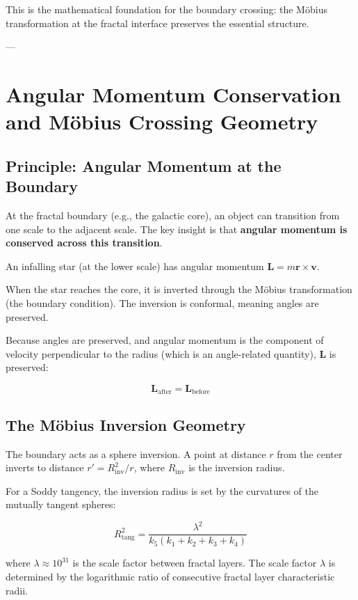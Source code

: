 \documentclass[11pt,a4paper]{article}
\begin{document}
    This is the mathematical foundation for the boundary crossing: the Möbius transformation at the fractal interface preserves the essential structure.

---


\section{Angular Momentum Conservation and Möbius Crossing Geometry}

  \subsection{Principle: Angular Momentum at the Boundary}

    At the fractal boundary (e.g., the galactic core), an object can transition from one scale to the adjacent scale. The key insight is that \textbf{angular momentum is conserved across this transition}.

    An infalling star (at the lower scale) has angular momentum $\mathbf{L} = m\mathbf{r} \times \mathbf{v}$.

    When the star reaches the core, it is inverted through the Möbius transformation (the boundary condition). The inversion is conformal, meaning angles are preserved.

    Because angles are preserved, and angular momentum is the component of velocity perpendicular to the radius (which is an angle-related quantity), $\mathbf{L}$ is preserved:

    \[
    \mathbf{L}_{\text{after}} = \mathbf{L}_{\text{before}}
    \]

  \subsection{The Möbius Inversion Geometry}

    The boundary acts as a sphere inversion. A point at distance $r$ from the center inverts to distance $r' = R_{\text{inv}}^2 / r$, where $R_{\text{inv}}$ is the inversion radius.

    For a Soddy tangency, the inversion radius is set by the curvatures of the mutually tangent spheres:

    \[
    R_{\text{tang}}^2 = \frac{\lambda^2}{k_5(k_1 + k_2 + k_3 + k_4)}
    \]

    where $\lambda \approx 10^{31}$ is the scale factor between fractal layers. The scale factor $\lambda$ is determined by the logarithmic ratio of consecutive fractal layer characteristic radii.
\end{document}
